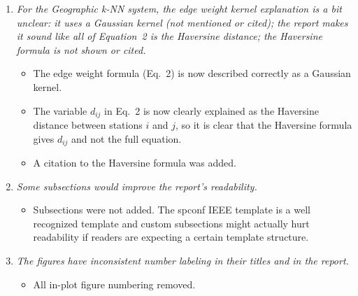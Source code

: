 \documentclass[11pt,onecolumn]{IEEEtran}
\begin{document}
\begin{enumerate}
      \item[2.4] {\em For the Geographic k-NN system, the edge weight kernel explanation is a bit unclear:
            it uses a Gaussian kernel (not mentioned or cited); the report makes it sound like all of
            Equation~2 is the Haversine distance; the Haversine formula is not shown or cited.}

            \vspace*{2mm}
            \begin{itemize}
                  \item The edge weight formula (Eq.~2) is now described correctly as a Gaussian kernel.
                  \item The variable $d_{ij}$ in Eq.~2 is now clearly explained as the Haversine distance
                        between stations $i$ and $j$, so it is clear that the Haversine formula gives $d_{ij}$
                        and not the full equation.
                  \item A citation to the Haversine formula was added.
            \end{itemize}
            \vspace*{4mm}

      \item[2.5] {\em Some subsections would improve the report's readability.}

            \vspace*{2mm}
            \begin{itemize}
                  \item Subsections were not added. The spconf IEEE template is a well recognized
                        template and custom subsections might actually hurt readability if readers
                        are expecting a certain template structure.
            \end{itemize}
            \vspace*{4mm}

      \item[2.6] {\em The figures have inconsistent number labeling in their titles and in the report.}

            \vspace*{2mm}
            \begin{itemize}
                  \item All in-plot figure numbering removed.
            \end{itemize}
            \vspace*{4mm}

\end{enumerate}
\end{document}
